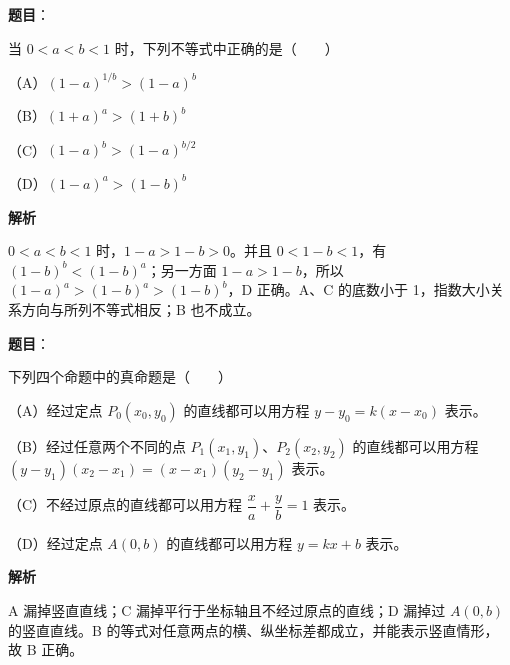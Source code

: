\begin{answer}

\textbf{题目}：

当 $0<a<b<1$ 时，下列不等式中正确的是\mbox{（　　）}

（A）$(1-a)^{1/b}>(1-a)^b$

（B）$(1+a)^a>(1+b)^b$

（C）$(1-a)^b>(1-a)^{b/2}$

（D）$(1-a)^a>(1-b)^b$

\textbf{解析}

$0<a<b<1$ 时，$1-a>1-b>0$。并且 $0<1-b<1$，有 $(1-b)^b<(1-b)^a$；另一方面 $1-a>1-b$，所以 $(1-a)^a>(1-b)^a>(1-b)^b$，D 正确。A、C 的底数小于 1，指数大小关系方向与所列不等式相反；B 也不成立。


\end{answer}
\begin{answer}

\textbf{题目}：

下列四个命题中的真命题是\mbox{（　　）}

（A）经过定点 $P_0(x_0,y_0)$ 的直线都可以用方程 $y-y_0=k(x-x_0)$ 表示。

（B）经过任意两个不同的点 $P_1(x_1,y_1)$、$P_2(x_2,y_2)$ 的直线都可以用方程 $(y-y_1)(x_2-x_1)=(x-x_1)(y_2-y_1)$ 表示。

（C）不经过原点的直线都可以用方程 $\dfrac xa+\dfrac yb=1$ 表示。

（D）经过定点 $A(0,b)$ 的直线都可以用方程 $y=kx+b$ 表示。

\textbf{解析}

A 漏掉竖直直线；C 漏掉平行于坐标轴且不经过原点的直线；D 漏掉过 $A(0,b)$ 的竖直直线。B 的等式对任意两点的横、纵坐标差都成立，并能表示竖直情形，故 B 正确。


\end{answer}

